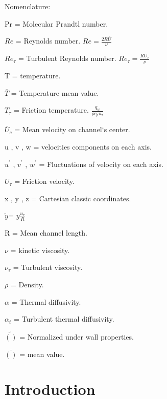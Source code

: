\documentclass[10pt]{article} %
\begin{document}
\pagebreak

\begin{LARGE}
	Nomenclature: 
\end{LARGE} 


	Pr = Molecular Prandtl number.
	
	
	
	
	$Re$ = Reynolds number. $Re = \frac{2R \overline{U}}{\nu}$
	
	
	$Re_\tau$ = Turbulent Reynolds number. $Re_\tau = \frac{R U_\tau}{\nu}$
	
	
	
	T = temperature.
	
	
	${\overline{T}}$ = Temperature mean value.
	
	
	
	$T_\tau$ = Friction temperature. $\frac{q_w}{\rho c_p u_\tau}$ 
	
	
	
	
	$\overline{U}_c$ = Mean velocity on channel`s center.
	
	
	
	u , v , w = velocities components on each axis.
	
	
	$u^\prime $ , $ v^\prime $ , $ w^\prime $ = Fluctuations of velocity on each axis.
	
	
	$U_\tau$ = Friction velocity.
	
	
	x , y , z = Cartesian classic coordinates.
	
	
	$\tilde{y} $= $ y \frac{u_\tau}{R} $
	
	
	R = Mean channel length.
	
	
	
	$\nu$ = kinetic viscosity.
	
	
	$\nu_\tau$ = Turbulent viscosity.
	
	
	$\rho$ = Density.
	
	
	$\alpha$ = Thermal diffusivity.
	
	
	$\alpha_t$ = Turbulent thermal diffusivity. 
	
	
	$\tilde{()}$ = Normalized under wall properties.
	
	$\overline{()}$ = mean value.  



\tableofcontents

\section{Introduction}
\end{document}
